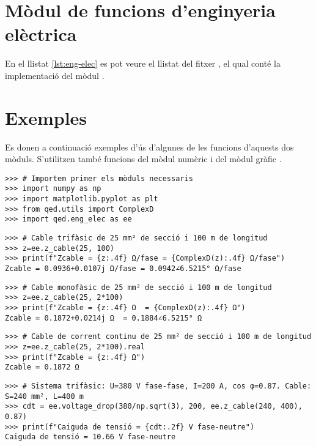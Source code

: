 \section{Mòdul de funcions d'enginyeria elèctrica}
En el llistat \vref{lst:eng-elec} es pot veure el llistat del fitxer , el qual conté la implementació del mòdul .




\section{Exemples}
Es donen a continuació  exemples d'ús d'algunes de les funcions d'aquests dos mòduls. S'utilitzen també funcions del mòdul numèric  i del mòdul gràfic .

\begin{lstlisting}
>>> # Importem primer els mòduls necessaris
>>> import numpy as np
>>> import matplotlib.pyplot as plt
>>> from qed.utils import ComplexD
>>> import qed.eng_elec as ee
\end{lstlisting} 


\begin{lstlisting}
>>> # Cable trifàsic de 25 mm² de secció i 100 m de longitud
>>> z=ee.z_cable(25, 100)
>>> print(f"Zcable = {z:.4f} Ω/fase = {ComplexD(z):.4f} Ω/fase")
Zcable = 0.0936+0.0107j Ω/fase = 0.0942∠6.5215° Ω/fase	
\end{lstlisting} 

\begin{lstlisting}
>>> # Cable monofàsic de 25 mm² de secció i 100 m de longitud
>>> z=ee.z_cable(25, 2*100)
>>> print(f"Zcable = {z:.4f} Ω  = {ComplexD(z):.4f} Ω")
Zcable = 0.1872+0.0214j Ω  = 0.1884∠6.5215° Ω	
\end{lstlisting}

\begin{lstlisting}
>>> # Cable de corrent continu de 25 mm² de secció i 100 m de longitud
>>> z=ee.z_cable(25, 2*100).real
>>> print(f"Zcable = {z:.4f} Ω")
Zcable = 0.1872 Ω	
\end{lstlisting}

\begin{lstlisting}
>>> # Sistema trifàsic: U=380 V fase-fase, I=200 A, cos φ=0.87. Cable: S=240 mm², L=400 m
>>> cdt = ee.voltage_drop(380/np.sqrt(3), 200, ee.z_cable(240, 400), 0.87)
>>> print(f"Caiguda de tensió = {cdt:.2f} V fase-neutre")
Caiguda de tensió = 10.66 V fase-neutre
\end{lstlisting}

